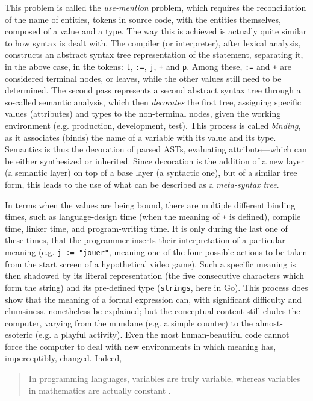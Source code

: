 This problem is called the \emph{use-mention} problem, which requires the reconciliation of the name of entities, tokens in source code, with the entities themselves, composed of a value and a type. The way this is achieved is actually quite similar to how syntax is dealt with. The compiler (or interpreter), after lexical analysis, constructs an abstract syntax tree representation of the statement, separating it, in the above case, in the tokens: \lstinline{l}, \lstinline{:=}, \lstinline{j}, \lstinline{+} and \lstinline{p}. Among these, \lstinline{:=} and \lstinline{+} are considered terminal nodes, or leaves, while the other values still need to be determined. The second pass represents a second abstract syntax tree through a so-called semantic analysis, which then \emph{decorates} the first tree, assigning specific values (attributes) and types to the non-terminal nodes, given the working environment (e.g. production, development, test). This process is called \emph{binding}, as it associates (binds) the name of a variable with its value and its type. Semantics is thus the decoration of parsed ASTs, evaluating attribute—which can be either synthesized or inherited. Since decoration is the addition of a new layer (a semantic layer) on top of a base layer (a syntactic one), but of a similar tree form, this leads to the use of what can be described as a \emph{meta-syntax tree}.

In terms when the values are being bound, there are multiple different binding times, such as language-design time (when the meaning of \lstinline{+} is defined), compile time, linker time, and program-writing time. It is only during the last one of these times, that the programmer inserts their interpretation of a particular meaning (e.g. \lstinline{j := "jouer"}, meaning one of the four possible actions to be taken from the start screen of a hypothetical video game). Such a specific meaning is then shadowed by its literal representation (the five consecutive characters which form the string) and its pre-defined type (\lstinline{strings}, here in Go). This process does show that the meaning of a formal expression can, with significant difficulty and clumsiness, nonetheless be explained; but the conceptual content still eludes the computer, varying from the mundane (e.g. a simple counter) to the almost-esoteric (e.g. a playful activity). Even the most human-beautiful code cannot force the computer to deal with new environments in which meaning has, imperceptibly, changed. Indeed,

\begin{quote}
  In programming languages, variables are truly variable, whereas variables in mathematics are actually constant \citep{wirth_essence_2003}.
\end{quote}

